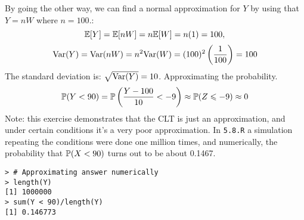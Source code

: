 \newpage\noindent
By going the other way, we can find a normal approximation for $Y$ by using that $Y = nW$
where $n=100$.:
$$
\E[Y] = \E[nW] = n\E[W] = n(1) = 100,
$$
$$
\V(Y) = \V(nW) = n^2\V(W) = (100)^2\left(\frac{1}{100}\right) = 100
$$
The standard deviation is: $\sqrt{\V(Y)} = 10$. Approximating the probability.
$$
\P(Y < 90) = \P\left(\frac{Y - 100}{10} < -9\right) \approx \P(Z\leq -9) \approx 0
$$
Note: this exercise demonstrates that the CLT is just an approximation,
and under certain conditions it's a very poor approximation. In \texttt{5.8.R}
a simulation repeating the conditions were done one million times, and numerically,
the probability that $\P(X < 90)$ turns out to be about 0.1467.
\begin{lstlisting}[style=RSyntax, title=R]
> # Approximating answer numerically
> length(Y)
[1] 1000000
> sum(Y < 90)/length(Y)
[1] 0.146773
\end{lstlisting}









